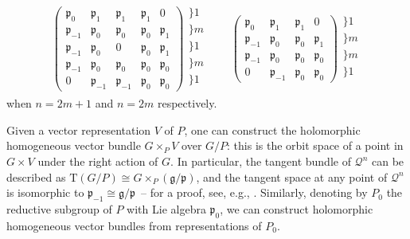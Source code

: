 \documentclass[pdftex]{sigma}
\numberwithin{equation}{section}
\newcommand{\mc} [1]{\mathcal{#1}}
\newcommand{\Tgt} {\mathrm{T}}
\newcommand{\g} {\mathfrak{g}}
\newcommand{\mfp} {\mathfrak{p}}
\begin{document}
\begin{gather*}
\left(
 \begin{array}{c|c|c|c|c}
\mfp_0 & \mfp_1 & \mfp_1 & \mfp_1 & 0 \\\hline 
\mfp_{-1} & \mfp_0 & \mfp_0 & \mfp_0 & \mfp_1 \\\hline 
\mfp_{-1} & \mfp_0 & 0 & \mfp_0 & \mfp_1 \\\hline 
\mfp_{-1} & \mfp_0 & \mfp_0 & \mfp_0 & \mfp_0 \\\hline 
0 & \mfp_{-1} & \mfp_{-1} & \mfp_0 & \mfp_0
\end{array} \right)
\begin{array}{l}
\} \scriptscriptstyle{1} \\ \} \scriptscriptstyle{m} \\ \} \scriptscriptstyle{1} \\ \} \scriptscriptstyle{m} \\ \} \scriptscriptstyle{1} \\
\end{array}
\qquad
\left(
 \begin{array}{c|c|c|c}
\mfp_0 & \mfp_1 & \mfp_1 & 0 \\\hline 
\mfp_{-1} & \mfp_0 & \mfp_0 & \mfp_1 \\\hline 
\mfp_{-1} & \mfp_0 & \mfp_0 & \mfp_0 \\\hline 
0 & \mfp_{-1} & \mfp_0 & \mfp_0
\end{array}
\right)
 \begin{array}{l}
\} \scriptscriptstyle{1} \\ \} \scriptscriptstyle{m} \\ \} \scriptscriptstyle{m} \\ \} \scriptscriptstyle{1} \\
\end{array}
\end{gather*}
when $n=2m+1$ and $n=2m$ respectively.

Given a vector representation $V$ of $P$, one can construct the holomorphic homogeneous vector bundle $G \times_P V$ over $G/P$: this is the orbit space of a point in $G \times V$ under the right action of $G$. In particular, the tangent bundle of $\mc{Q}^n$ can be described as $\Tgt (G/P) \cong G \times_P \left( \g/\mfp \right)$, and the tangent space at any point of $\mc{Q}^n$ is isomorphic to $\mfp_{-1} \cong \g/\mfp$~-- for a proof, see, e.g., \cite{vCap2009}. Similarly, denoting by $P_0$ the reductive subgroup of $P$ with Lie algebra $\mfp_0$, we can construct holomorphic homogeneous vector bundles from representations of $P_0$.
\end{document}
